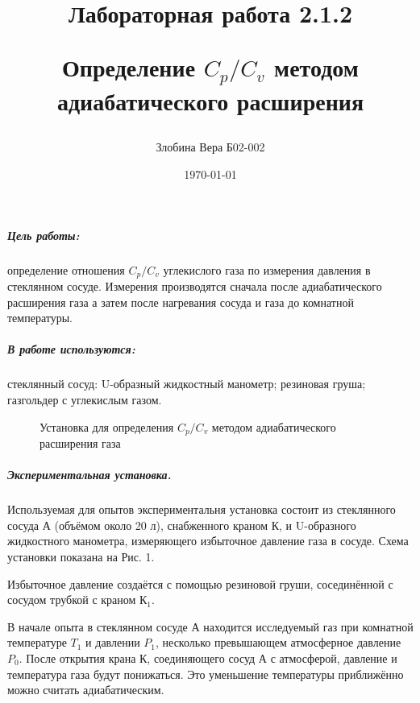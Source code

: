 \documentclass[a4paper,12pt]{article}
\author{Злобина Вера Б02-002}
\title{Лабораторная работа 2.1.2

Определение $C_p / C_v$ методом адиабатического расширения}
\date{\today}
\begin{document}
	
\maketitle 
	
	
\newpage


\subparagraph*{Цель работы:}определение отношения $C_p / C_v$ углекислого газа  по измерения давления в стеклянном сосуде. Измерения производятся сначала после адиабатического расширения газа а затем после нагревания сосуда и газа до комнатной температуры. 
\subparagraph*{В работе используются:}стеклянный сосуд: U-образный жидкостный манометр; резиновая груша; газгольдер с углекислым газом. 

\begin{figure}[b!]	\label{plan2}
	
	\caption{Установка для определения $C_p / C_v$ методом адиабатического расширения газа}
	
\end{figure}



\subparagraph*{Экспериментальная установка.} Используемая для опытов экспериментальня установка состоит из стеклянного сосуда А (объёмом около 20 л), снабженного краном К, и U-образного жидкостного манометра, измеряющего избыточное давление газа в сосуде. Схема установки показана на Рис. 1. 

Избыточное давление создаётся с помощью резиновой груши, сосединённой с сосудом трубкой с краном $К_1$.

В начале опыта  в стеклянном сосуде А находится исследуемый газ при комнатной температуре $T_1$ и давлении $P_1$, несколько превышающем атмосферное давление  $P_0$. После открытия крана К, соединяющего сосуд А с атмосферой, давление и температура газа будут понижаться. Это уменьшение температуры приближённо можно считать адиабатическим. 
\end{document}
